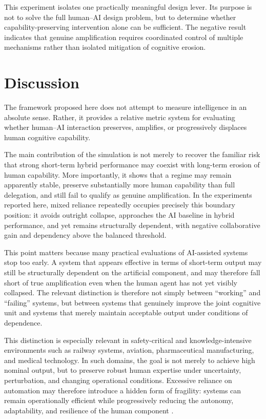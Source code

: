 \documentclass[11pt,a4paper]{article}
\begin{document}
This experiment isolates one practically meaningful design lever. Its purpose is not to solve the full human--AI design problem, but to determine whether capability-preserving intervention alone can be sufficient. The negative result indicates that genuine amplification requires coordinated control of multiple mechanisms rather than isolated mitigation of cognitive erosion.

\section{Discussion}

The framework proposed here does not attempt to measure intelligence in an absolute sense. Rather, it provides a relative metric system for evaluating whether human--AI interaction preserves, amplifies, or progressively displaces human cognitive capability.

The main contribution of the simulation is not merely to recover the familiar risk that strong short-term hybrid performance may coexist with long-term erosion of human capability. More importantly, it shows that a regime may remain apparently stable, preserve substantially more human capability than full delegation, and still fail to qualify as genuine amplification. In the experiments reported here, mixed reliance repeatedly occupies precisely this boundary position: it avoids outright collapse, approaches the AI baseline in hybrid performance, and yet remains structurally dependent, with negative collaborative gain and dependency above the balanced threshold.

This point matters because many practical evaluations of AI-assisted systems stop too early. A system that appears effective in terms of short-term output may still be structurally dependent on the artificial component, and may therefore fall short of true amplification even when the human agent has not yet visibly collapsed. The relevant distinction is therefore not simply between ``working'' and ``failing'' systems, but between systems that genuinely improve the joint cognitive unit and systems that merely maintain acceptable output under conditions of dependence.

This distinction is especially relevant in safety-critical and knowledge-intensive environments such as railway systems, aviation, pharmaceutical manufacturing, and medical technology. In such domains, the goal is not merely to achieve high nominal output, but to preserve robust human expertise under uncertainty, perturbation, and changing operational conditions. Excessive reliance on automation may therefore introduce a hidden form of fragility: systems can remain operationally efficient while progressively reducing the autonomy, adaptability, and resilience of the human component \cite{automation-bias,overreliance-ai}.
\end{document}
